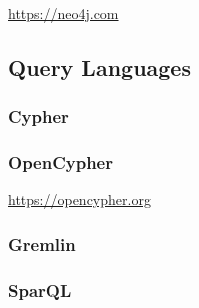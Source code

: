 \url{https://neo4j.com}

\subsection{Query Languages}
\subsubsection{Cypher}
\subsubsection{OpenCypher}

\url{https://opencypher.org}

\subsubsection{Gremlin}
\subsubsection{SparQL}


